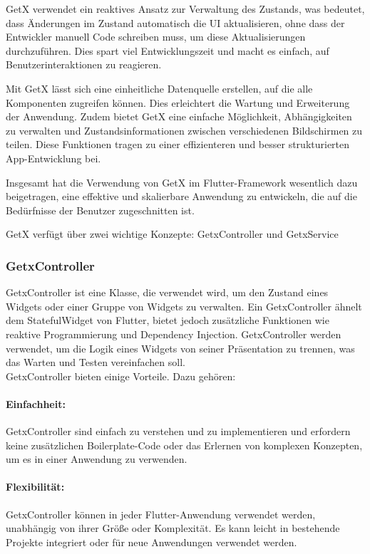 GetX verwendet ein reaktives Ansatz zur Verwaltung des Zustands, was bedeutet, dass Änderungen im Zustand automatisch die UI aktualisieren, ohne dass der Entwickler manuell Code schreiben muss, um diese Aktualisierungen durchzuführen. Dies spart viel Entwicklungszeit und macht es einfach, auf Benutzerinteraktionen zu reagieren.

Mit GetX lässt sich eine einheitliche Datenquelle erstellen, auf die alle Komponenten zugreifen können. Dies erleichtert die Wartung und Erweiterung der Anwendung. Zudem bietet GetX eine einfache Möglichkeit, Abhängigkeiten zu verwalten und Zustandsinformationen zwischen verschiedenen Bildschirmen zu teilen. Diese Funktionen tragen zu einer effizienteren und besser strukturierten App-Entwicklung bei.

Insgesamt hat die Verwendung von GetX im Flutter-Framework wesentlich dazu beigetragen, eine effektive und skalierbare Anwendung zu entwickeln, die auf die Bedürfnisse der Benutzer zugeschnitten ist.



GetX verfügt über zwei wichtige Konzepte: GetxController und GetxService

\subsubsection{GetxController}
GetxController ist eine Klasse, die verwendet wird, um den Zustand eines Widgets oder einer Gruppe von Widgets zu verwalten. Ein GetxController ähnelt dem StatefulWidget von Flutter, bietet jedoch zusätzliche Funktionen wie reaktive Programmierung und Dependency Injection. GetxController werden verwendet, um die Logik eines Widgets von seiner Präsentation zu trennen, was das Warten und Testen vereinfachen soll.
\\
GetxController bieten einige Vorteile. Dazu gehören:
\\
\paragraph{Einfachheit:}
GetxController sind einfach zu verstehen und zu implementieren und erfordern keine zusätzlichen Boilerplate-Code oder das Erlernen von komplexen Konzepten, um es in einer Anwendung zu verwenden.
\\
\paragraph{Flexibilität:}
GetxController können in jeder Flutter-Anwendung verwendet werden, unabhängig von ihrer Größe oder Komplexität. Es kann leicht in bestehende Projekte integriert oder für neue Anwendungen verwendet werden.
\\
